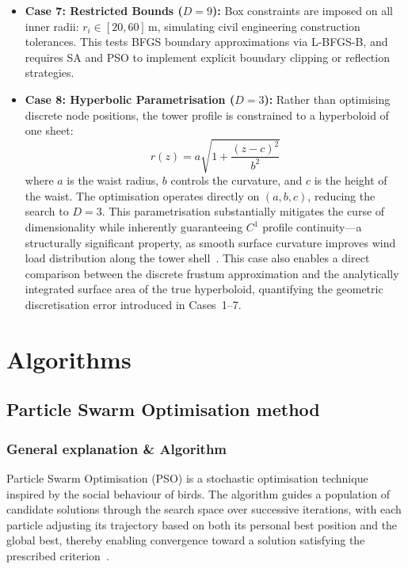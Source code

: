 \begin{itemize}
    \item \textbf{Case 7: Restricted Bounds ($D = 9$):}
    Box constraints are imposed on all inner radii: $r_i \in [20, 60]\,\text{m}$, simulating civil engineering construction tolerances. 
	This tests BFGS boundary approximations via L-BFGS-B, and requires SA and PSO to implement explicit boundary clipping or reflection strategies.

    \item \textbf{Case 8: Hyperbolic Parametrisation ($D = 3$):}
    Rather than optimising discrete node positions, the tower profile is constrained to a hyperboloid of one sheet:
    \begin{equation}
        r(z) = a\sqrt{1 + \frac{(z - c)^2}{b^2}}
    \end{equation}
    where $a$ is the waist radius, $b$ controls the curvature, and $c$ is the height of the waist. The optimisation operates directly on $(a, b, c)$, reducing the search to $D = 3$. This parametrisation substantially mitigates the curse of dimensionality while inherently guaranteeing $C^1$ profile continuity---a structurally significant property, as smooth surface curvature improves wind load distribution along the tower shell~\cite{mungan1976buckling}. This case also enables a direct comparison between the discrete frustum approximation and the analytically integrated surface area of the true hyperboloid, quantifying the geometric discretisation error introduced in Cases~1--7.

\end{itemize}


\section{Algorithms}

\subsection{Particle Swarm Optimisation method \cite{task3report}}

\subsubsection{General explanation \& Algorithm}

Particle Swarm Optimisation (PSO) is a stochastic optimisation technique inspired by the social behaviour of birds. The algorithm guides a population of candidate solutions through the search space over successive iterations, with each particle adjusting its trajectory based on both its personal best position and the global best, thereby enabling convergence toward a solution satisfying the prescribed criterion~\cite{riaz_lec2}.

